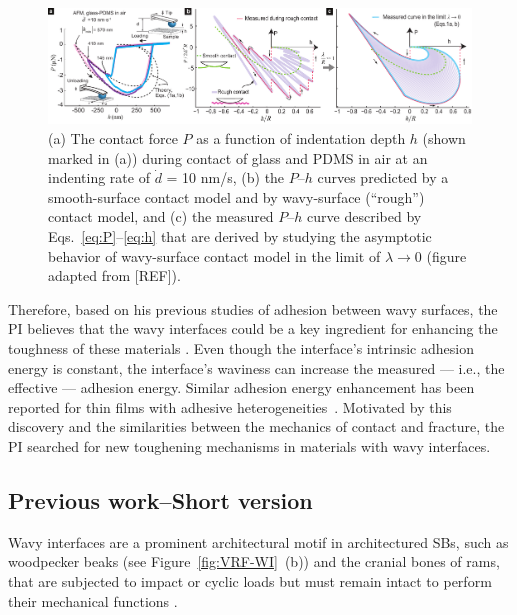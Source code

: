\documentclass[10pt,letterpaper]{article}
\begin{document}
%
%
\begin{figure}[h]
	\includegraphics[width=\textwidth]{../../Proposal/ProjectDescription/Figures/WavyInterface/DDHAFM.pdf}
	\centering
	\caption{(a) The contact force $P$ as a function of indentation depth $h$ (shown marked in (a)) during contact of glass and PDMS in air at an indenting rate of $\dot{d}$ = 10 nm/s, (b) the $P$--$h$ curves predicted by a smooth-surface contact model and by wavy-surface (``rough'') contact model, and (c) the measured $P$--$h$ curve described by Eqs.~\eqref{eq:P}--\eqref{eq:h} that are derived by studying the asymptotic behavior of wavy-surface contact model in the limit of $\lambda \to 0$ (figure adapted from [REF]).}
	\label{fig:DDHAFM} 
\end{figure}



Therefore, based on his previous studies of adhesion between wavy surfaces, the PI believes that the wavy interfaces could be a key ingredient for enhancing the toughness of these materials \cite{li2012numerical,wang2012specific,zavattieri2007determination,haghpanah2014adhesively}. 
%
Even though the interface's intrinsic adhesion energy is constant, the interface's waviness can increase the measured --- i.e., the effective --- adhesion energy. 
%
Similar adhesion energy enhancement has been reported for thin films with adhesive heterogeneities~\cite{xia2015adhesion}. 
%
Motivated by this discovery and the similarities between the mechanics of contact and fracture, the PI searched for new toughening mechanisms in materials with wavy interfaces.


\subsection{Previous work--Short version}
Wavy interfaces are a prominent architectural motif in architectured SBs, such as woodpecker beaks (see Figure~\ref{fig:VRF-WI}~(b)) and the cranial bones of rams, that are subjected to impact or cyclic loads but must remain intact to perform their mechanical functions \cite{lee2014hierarchical, jaslow1990mechanical}.
\end{document}
